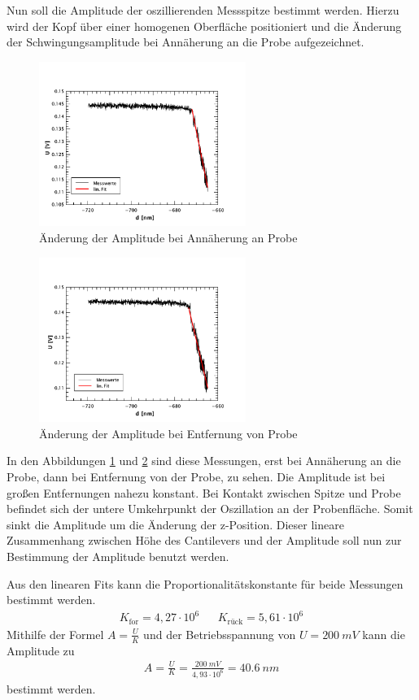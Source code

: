 Nun soll die Amplitude der oszillierenden Messspitze bestimmt werden. Hierzu wird
der Kopf über einer homogenen Oberfläche positioniert und die Änderung der 
Schwingungsamplitude bei Annäherung an die Probe aufgezeichnet.
\begin{figure}[hp]
    \centering
    \includegraphics[width=0.6\textwidth]{Mess/spek_forw.pdf}
    \caption{Änderung der Amplitude bei Annäherung an Probe}
    \label{spek_forw}
\end{figure}
\begin{figure}[hp]
    \centering
    \includegraphics[width=0.6\textwidth]{Mess/spek_backw.pdf}
    \caption{Änderung der Amplitude bei Entfernung von Probe}
    \label{spek_backw}
\end{figure}
In den Abbildungen \ref{spek_forw} und \ref{spek_backw} sind diese Messungen, erst
bei Annäherung an die Probe, dann bei Entfernung von der Probe, zu sehen. Die 
Amplitude ist bei großen Entfernungen nahezu konstant. Bei Kontakt zwischen Spitze
und Probe befindet sich der untere Umkehrpunkt der Oszillation an der Probenfläche.
Somit sinkt die Amplitude um die Änderung der z-Position. Dieser lineare 
Zusammenhang zwischen Höhe des Cantilevers und der Amplitude soll nun zur 
Bestimmung der Amplitude benutzt werden.\par
Aus den linearen Fits kann die Proportionalitätskonstante für beide Messungen
bestimmt werden.
\begin{align*}
    K_{\text{for}} = 4,27 \cdot 10^6 & & K_{\text{rück}} = 5,61 \cdot 10^6
\end{align*}
Mithilfe der Formel $\displaystyle A = \frac{U}{K}$ und der Betriebsspannung
von $U = \SI{200}{mV}$ kann die Amplitude zu
\begin{align*}
    A = \frac{U}{K} = \frac{\SI{200}{mV}}{4,93 \cdot 10^6} = \SI{40,6}{nm}
\end{align*}
bestimmt werden.

